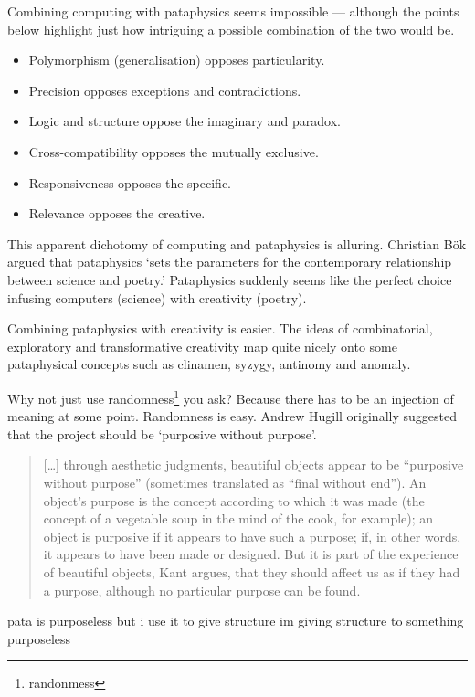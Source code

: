 Combining computing with pataphysics seems impossible --- although the points below highlight just how intriguing a possible combination of the two would be.

\begin{itemize}
  \item Polymorphism (generalisation) opposes particularity.
  \item Precision opposes exceptions and contradictions.
  \item Logic and structure oppose the imaginary and paradox.
  \item Cross-compatibility opposes the mutually exclusive.
  \item Responsiveness opposes the specific.
  \item Relevance opposes the creative.
\end{itemize}

This apparent dichotomy of computing and pataphysics is alluring. Christian B{\"o}k argued that pataphysics `sets the parameters for the contemporary relationship between science and poetry.' \citeyear{Boek2002} Pataphysics suddenly seems like the perfect choice infusing computers (science) with creativity (poetry).

Combining pataphysics with creativity is easier. The ideas of  combinatorial, exploratory and transformative creativity map quite nicely onto some pataphysical concepts such as clinamen, syzygy, antinomy and anomaly.


\begin{fcom}



Why not just use randomness\footnote{randonmess} you ask? Because there has to be an injection of meaning at some point. Randomness is easy. Andrew Hugill originally suggested that the project should be `purposive without purpose'.

\begin{quotation}
  [\ldots] through aesthetic judgments, beautiful objects appear to be ``purposive without purpose'' (sometimes translated as ``final without end''). An object's purpose is the concept according to which it was made (the concept of a vegetable soup in the mind of the cook, for example); an object is purposive if it appears to have such a purpose; if, in other words, it appears to have been made or designed. But it is part of the experience of beautiful objects, Kant argues, that they should affect us as if they had a purpose, although no particular purpose can be found. 
\end{quotation}

pata is purposeless but i use it to give structure
im giving structure to something purposeless
\end{fcom}

